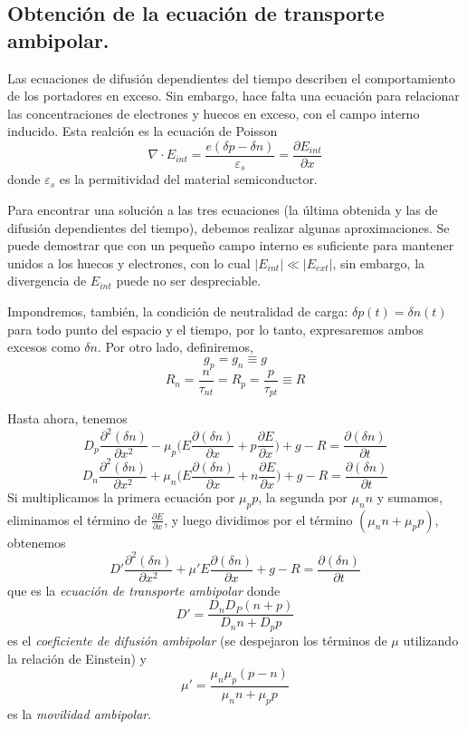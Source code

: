 \documentclass[12pt,a4paper]{article}
\begin{document}
\subsection{Obtención de la ecuación de transporte ambipolar.}

Las ecuaciones de difusión dependientes del tiempo describen el comportamiento de los portadores en exceso. Sin embargo, hace falta una ecuación para relacionar las concentraciones de electrones y huecos en exceso, con el campo interno inducido. Esta realción es la ecuación de Poisson
\[ \nabla \cdot E_{int} = \frac{e(\delta p - \delta n)}{\varepsilon _{s}} = \frac{\partial E_{int}}{\partial x} \]
donde $\varepsilon _{s}$ es la permitividad del material semiconductor.

Para encontrar una solución a las tres ecuaciones (la última obtenida y las de difusión dependientes del tiempo), debemos realizar algunas aproximaciones. Se puede demostrar que con un pequeño campo interno es suficiente para mantener unidos a los huecos y electrones, con lo cual $|E_{int}| \ll |E_{ext}|$, sin embargo, la divergencia de $E_{int}$ puede no ser despreciable.

Impondremos, también, la condición de neutralidad de carga: $\delta p(t)=\delta n(t)$ para todo punto del espacio y el tiempo, por lo tanto, expresaremos ambos excesos como $\delta n$. Por otro lado, definiremos,
\[ g_{p}=g_{n}\equiv g\]
\[ R_{n}=\frac{n}{\tau _{nt}}=R_{p}=\frac{p}{\tau _{pt}} \equiv R \]

Hasta ahora, tenemos
\[ D_{p} \frac{\partial^{2}(\delta n)}{\partial x^{2}}- \mu _{p} \bigg( E \frac{\partial (\delta n)}{\partial x} + p \frac{\partial E}{\partial x} \bigg) + g - R = \frac{\partial (\delta n)}{\partial t} \]
\[ D_{n} \frac{\partial^{2}(\delta n)}{\partial x^{2}}+ \mu _{n} \bigg( E \frac{\partial (\delta n)}{\partial x} + n \frac{\partial E}{\partial x} \bigg) + g - R = \frac{\partial (\delta n)}{\partial t} \]
Si multiplicamos la primera ecuación por $\mu _{p}p$, la segunda por $\mu _{n}n$ y sumamos, eliminamos el término de $\frac{\partial E}{\partial x}$, y luego dividimos por el término $(\mu _{n}n+\mu_{p}p)$, obtenemos
\[ D'\frac{\partial^{2} (\delta n)}{\partial x^{2}} + \mu' E \frac{\partial (\delta n)}{\partial x}+g-R=\frac{\partial (\delta n)}{\partial t} \]
que es la \emph{ecuación de transporte ambipolar} donde
\[ D'=\frac{D_{n}D_{P}(n+p)}{D_{n}n+D_{p}p} \]
es el \emph{coeficiente de difusión ambipolar} (se despejaron los términos de $\mu$ utilizando la relación de Einstein) y
\[ \mu'=\frac{\mu _{n} \mu _{p}(p-n)}{\mu _{n}n+\mu _{p}p} \]
es la \emph{movilidad ambipolar}.
\end{document}
